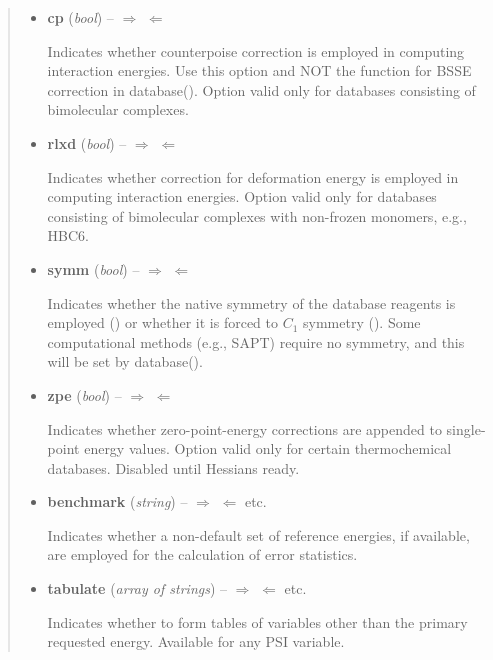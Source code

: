 \documentclass[letterpaper,10pt,english]{sphinxmanual}
\begin{document}
\begin{fulllineitems}
\begin{quote}
\begin{description}
\begin{itemize}
\item {} 
\textbf{cp} (\emph{bool}) -- 
 \textbar{}\textbar{} $\Rightarrow$  $\Leftarrow$

Indicates whether counterpoise correction is employed in computing
interaction energies. Use this option and NOT the {\hyperref[index:wrappers.cp]{}}
function for BSSE correction in database().  Option
valid only for databases consisting of bimolecular complexes.


\item {} 
\textbf{rlxd} (\emph{bool}) -- 
 \textbar{}\textbar{} $\Rightarrow$  $\Leftarrow$

Indicates whether correction for deformation energy is
employed in computing interaction energies.  Option valid only for
databases consisting of bimolecular complexes with non-frozen
monomers, e.g., HBC6.


\item {} 
\textbf{symm} (\emph{bool}) -- 
$\Rightarrow$  $\Leftarrow$ \textbar{}\textbar{} 

Indicates whether the native symmetry of the database reagents is
employed () or whether it is forced to $C_1$ symmetry
(). Some computational methods (e.g., SAPT) require no
symmetry, and this will be set by database().


\item {} 
\textbf{zpe} (\emph{bool}) -- 
 \textbar{}\textbar{} $\Rightarrow$  $\Leftarrow$

Indicates whether zero-point-energy corrections are appended to
single-point energy values. Option valid only for certain
thermochemical databases. Disabled until Hessians ready.


\item {} 
\textbf{benchmark} (\emph{string}) -- 
$\Rightarrow$  $\Leftarrow$ \textbar{}\textbar{}  \textbar{}\textbar{} etc.

Indicates whether a non-default set of reference energies, if
available, are employed for the calculation of error statistics.


\item {} 
\textbf{tabulate} (\emph{array of strings}) -- 
$\Rightarrow$ \code{{[}{]}} $\Leftarrow$ \textbar{}\textbar{}  \textbar{}\textbar{} etc.

Indicates whether to form tables of variables other than the
primary requested energy.  Available for any PSI variable.



\end{itemize}
\end{description}
\end{quote}
\end{fulllineitems}
\end{document}
